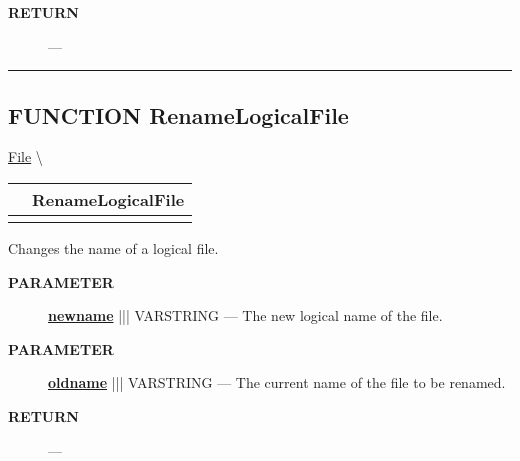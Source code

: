 \par
\begin{description}
\item [\colorbox{tagtype}{\color{white} \textbf{\textsf{RETURN}}}] \textbf{} --- 
\end{description}




\rule{\linewidth}{0.5pt}
\subsection*{\textsf{\colorbox{headtoc}{\color{white} FUNCTION}
RenameLogicalFile}}

\hypertarget{ecldoc:file.renamelogicalfile}{}
\hspace{0pt} \hyperlink{ecldoc:File}{File} \textbackslash 

{\renewcommand{\arraystretch}{1.5}
\begin{tabularx}{\textwidth}{|>{\raggedright\arraybackslash}l|X|}
\hline
\hspace{0pt}\mytexttt{\color{red} } & \textbf{RenameLogicalFile} \\
\hline
\multicolumn{2}{|>{\raggedright\arraybackslash}X|}{\hspace{0pt}\mytexttt{\color{param} (varstring oldname, varstring newname)}} \\
\hline
\end{tabularx}
}

\par





Changes the name of a logical file.






\par
\begin{description}
\item [\colorbox{tagtype}{\color{white} \textbf{\textsf{PARAMETER}}}] \textbf{\underline{newname}} ||| VARSTRING --- The new logical name of the file.
\item [\colorbox{tagtype}{\color{white} \textbf{\textsf{PARAMETER}}}] \textbf{\underline{oldname}} ||| VARSTRING --- The current name of the file to be renamed.
\end{description}







\par
\begin{description}
\item [\colorbox{tagtype}{\color{white} \textbf{\textsf{RETURN}}}] \textbf{} --- 
\end{description}




